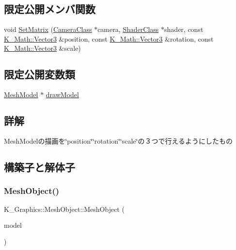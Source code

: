 \subsection*{限定公開メンバ関数}
\begin{DoxyCompactItemize}
\item 
void \mbox{\hyperlink{class_k___graphics_1_1_mesh_object_a29b665637b075b4839af390356c5bf3c}{Set\+Matrix}} (\mbox{\hyperlink{class_k___graphics_1_1_camera_class}{Camera\+Class}} $\ast$camera, \mbox{\hyperlink{class_k___graphics_1_1_shader_class}{Shader\+Class}} $\ast$shader, const \mbox{\hyperlink{namespace_k___math_a66884d78082c39ada4091c211f3570f8}{K\+\_\+\+Math\+::\+Vector3}} \&position, const \mbox{\hyperlink{namespace_k___math_a66884d78082c39ada4091c211f3570f8}{K\+\_\+\+Math\+::\+Vector3}} \&rotation, const \mbox{\hyperlink{namespace_k___math_a66884d78082c39ada4091c211f3570f8}{K\+\_\+\+Math\+::\+Vector3}} \&scale)
\end{DoxyCompactItemize}
\subsection*{限定公開変数類}
\begin{DoxyCompactItemize}
\item 
\mbox{\hyperlink{class_k___graphics_1_1_mesh_model}{Mesh\+Model}} $\ast$ \mbox{\hyperlink{class_k___graphics_1_1_mesh_object_a3691b447ef31ac253864166711b87ea7}{draw\+Model}}
\end{DoxyCompactItemize}


\subsection{詳解}
Mesh\+Modelの描画を\char`\"{}position\char`\"{}\char`\"{}rotation\char`\"{}\char`\"{}scale\char`\"{}の３つで行えるようにしたもの 

\subsection{構築子と解体子}
\mbox{\label{class_k___graphics_1_1_mesh_object_af59273310f07f67f766f9e90323ce641}} 
\subsubsection{\texorpdfstring{Mesh\+Object()}{MeshObject()}}
{\footnotesize\ttfamily K\+\_\+\+Graphics\+::\+Mesh\+Object\+::\+Mesh\+Object (\begin{DoxyParamCaption}\item[{\mbox{\hyperlink{class_k___graphics_1_1_mesh_model}{Mesh\+Model}} $\ast$}]{model }\end{DoxyParamCaption})}



